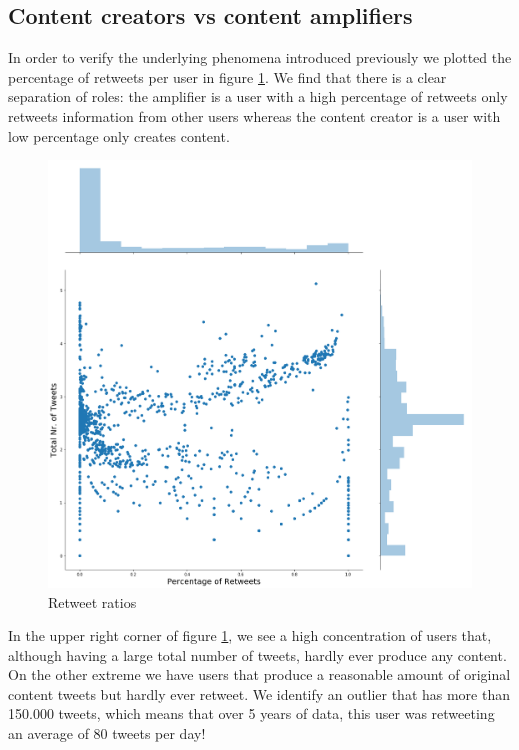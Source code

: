 \documentclass[12pt, authoryear]{elsarticle}
\begin{document}
\subsection{Content creators vs content amplifiers}

In order to verify the underlying phenomena introduced previously we plotted the percentage of retweets per user in figure \ref{retweets:1}. We find that there is a clear separation of roles: the amplifier is a user with a high percentage of retweets only retweets information from other users whereas the content creator is a user with low percentage only creates content.

\begin{figure}[t]
\includegraphics[width=\textwidth]{retweets}
\centering
\caption{Retweet ratios}
\label{retweets:1}
\end{figure}

In the upper right corner of figure  \ref{retweets:1}, we see a high concentration of users that, although having a large total number of tweets, hardly ever produce any content. On the other extreme we have users that produce a reasonable amount of original content tweets but hardly ever retweet. We identify an outlier that has more than 150.000 tweets, which means that over 5 years of data, this user was retweeting an average of 80 tweets per day!
\end{document}
